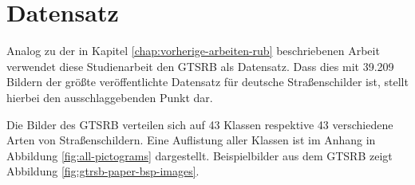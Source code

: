 \section{Datensatz}

\label{chap:3-Datensatz}
Analog zu der in Kapitel \ref{chap:vorherige-arbeiten-rub} beschriebenen Arbeit verwendet diese Studienarbeit den \ac{GTSRB} als Datensatz. Dass dies mit 39.209 Bildern der größte veröffentlichte Datensatz für deutsche Straßenschilder ist, stellt hierbei den ausschlaggebenden Punkt dar.

Die Bilder des \ac{GTSRB} verteilen sich auf 43 Klassen respektive 43 verschiedene Arten von Straßenschildern. Eine Auflistung aller Klassen ist im Anhang in Abbildung \ref{fig:all-pictograms} dargestellt. Beispielbilder aus dem \ac{GTSRB} zeigt Abbildung \ref{fig:gtrsb-paper-bsp-images}. \cite{GTSRB}


